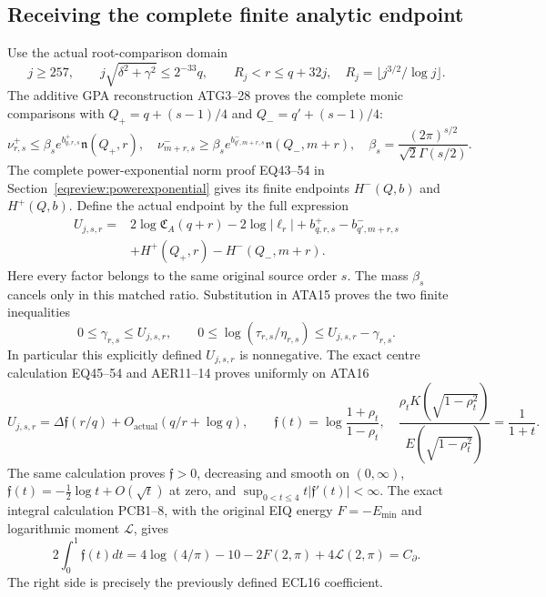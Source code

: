 \subsection{Receiving the complete finite analytic endpoint}
Use the actual root-comparison domain
\[
 j\ge257,\qquad j\sqrt{\delta^2+\gamma^2}\le2^{-33}q,
 \qquad R_j<r\le q+32j,
 \quad R_j=\lfloor j^{3/2}/\log j\rfloor.                \tag{ATA16}
\]
The additive GPA reconstruction ATG3--28 proves the complete monic comparisons
with $Q_+=q+(s-1)/4$ and $Q_-=q'+(s-1)/4$:
\[
 \nu^+_{r,s}\le\beta_se^{b^+_{q,r,s}}\mathfrak n(Q_+,r),
 \quad
 \nu^-_{m+r,s}\ge\beta_se^{b^-_{q',m+r,s}}\mathfrak n(Q_-,m+r),
 \quad\beta_s=\frac{(2\pi)^{s/2}}{\sqrt2\Gamma(s/2)}.
\]
The complete power-exponential norm proof EQ43--54 in
Section~\ref{eqreview:powerexponential} gives its finite endpoints
$H^-(Q,b)$ and $H^+(Q,b)$.
Define the actual endpoint by the full expression
\[
\begin{split}
 U_{j,s,r}={}&2\log\mathfrak C_A(q+r)-2\log|\ell_r|
 +b^+_{q,r,s}-b^-_{q',m+r,s}\\
 &+H^+(Q_+,r)-H^-(Q_-,m+r).
\end{split}\tag{ATA17}
\]
Here every factor belongs to the same original source order $s$.
The mass $\beta_s$ cancels only in this matched ratio.  Substitution
in ATA15 proves the two finite inequalities
\[
 0\le\gamma_{r,s}\le U_{j,s,r},\qquad
 0\le\log(\tau_{r,s}/\eta_{r,s})\le U_{j,s,r}-\gamma_{r,s}.
                                                               \tag{ATA18}
\]
In particular this explicitly defined $U_{j,s,r}$ is nonnegative.
The exact centre calculation EQ45--54 and AER11--14 proves uniformly on ATA16
\[
 U_{j,s,r}=\Delta\mathfrak f(r/q)
                  +O_{\mathrm{actual}}(q/r+\log q),
 \qquad
 \mathfrak f(t)=\log\frac{1+\rho_t}{1-\rho_t},\quad
 \frac{\rho_tK(\sqrt{1-\rho_t^2})}
      {E(\sqrt{1-\rho_t^2})}=\frac1{1+t}.               \tag{ATA19}
\]
The same calculation proves $\mathfrak f>0$, decreasing and smooth
on $(0,\infty)$, $\mathfrak f(t)=-\tfrac12\log t+O(\sqrt t)$
at zero, and $\sup_{0<t\le4}t|\mathfrak f'(t)|<\infty$.
The exact integral calculation PCB1--8, with the original EIQ energy
$F=-E_{\min}$ and logarithmic moment $\mathcal L$, gives
\[
 2\int_0^1\mathfrak f(t)dt
 =4\log(4/\pi)-10-2F(2,\pi)+4\mathcal L(2,\pi)
 =C_\partial.                                        \tag{ATA20}
\]
The right side is precisely the previously defined ECL16 coefficient.

